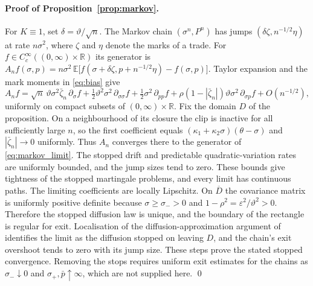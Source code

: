\documentclass[11pt,a4paper]{article}
\theoremstyle{definition}
\newcommand{\E}{\mathbb{E}}
\begin{document}
\paragraph{Proof of Proposition~\ref{prop:markov}.} For $K\equiv1$, set $\delta=\vartheta/\sqrt n$. The Markov chain $(\sigma^n,P^n)$ has jumps $(\delta\zeta,n^{-1/2}\eta)$ at rate $n\sigma^2$, where $\zeta$ and $\eta$ denote the marks of a trade. For $f\in C_c^\infty((0,\infty)\times\mathbb R)$ its generator is $A_nf(\sigma,p)=n\sigma^2\,\E\big[f(\sigma+\delta\zeta,p+n^{-1/2}\eta)-f(\sigma,p)\big]$. Taylor expansion and the mark moments in \eqref{eq:bias} give
\begin{equation*}
A_nf=\sqrt n\,\vartheta\sigma^2\bar\zeta_n\,\partial_\sigma f+\tfrac12\vartheta^2\sigma^2\,\partial_{\sigma\sigma}f+\tfrac12\sigma^2\,\partial_{pp}f+\rho(1-|\bar\zeta_n|)\vartheta\sigma^2\,\partial_{\sigma p}f+O(n^{-1/2}),
\end{equation*}
uniformly on compact subsets of $(0,\infty)\times\mathbb R$. Fix the domain $D$ of the proposition. On a neighbourhood of its closure the clip is inactive for all sufficiently large $n$, so the first coefficient equals $(\kappa_1+\kappa_2\sigma)(\theta-\sigma)$ and $|\bar\zeta_n|\to0$ uniformly. Thus $A_n$ converges there to the generator of \eqref{eq:markov_limit}. The stopped drift and predictable quadratic-variation rates are uniformly bounded, and the jump sizes tend to zero. These bounds give tightness of the stopped martingale problems, and every limit has continuous paths. The limiting coefficients are locally Lipschitz. On $\overline D$ the covariance matrix is uniformly positive definite because $\sigma\ge\sigma_->0$ and $1-\rho^2=\varepsilon^2/\vartheta^2>0$. Therefore the stopped diffusion law is unique, and the boundary of the rectangle is regular for exit. Localisation of the diffusion-approximation argument of \citet{EthierKurtz1986} identifies the limit as the diffusion stopped on leaving $D$, and the chain's exit overshoot tends to zero with its jump size. These steps prove the stated stopped convergence. Removing the stops requires uniform exit estimates for the chains as $\sigma_-\downarrow0$ and $\sigma_+,\bar p\uparrow\infty$, which are not supplied here. \qed
\end{document}

